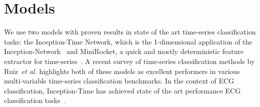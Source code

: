 \documentclass{article}
\begin{document}
\section{Models}
\label{sec:models}
We use two models with proven results in state of the art time-series classification tasks: the Inception-Time Network, which is the 1-dimensional application of the Inception-Network~\cite{szegedy2017inception,ismail2020inceptiontime} and MiniRocket, a quick and mostly deterministic feature extractor for time-series~\cite{dempster2021minirocket}. A recent survey of time-series classification methods by Ruiz~\textit{et al.} highlights both of these models as excellent performers in various multi-variable time-series classification benchmarks. In the context of ECG classification, Inception-Time has achieved state of the art performance ECG classification tasks~\cite{Strodthoff2021}.




\end{document}
